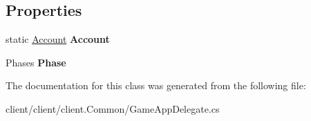 \subsection*{Properties}
\begin{DoxyCompactItemize}
\item 
\hypertarget{classClient_1_1Common_1_1GameAppDelegate_aa626869ffdd0e3f8f46ab069bc24f0d1}{static \hyperlink{classCore_1_1Models_1_1Account}{Account} {\bfseries Account}}\label{classClient_1_1Common_1_1GameAppDelegate_aa626869ffdd0e3f8f46ab069bc24f0d1}

\item 
\hypertarget{classClient_1_1Common_1_1GameAppDelegate_a2fb6f0fd7533c38a555760efd3ea896b}{Phases {\bfseries Phase}}\label{classClient_1_1Common_1_1GameAppDelegate_a2fb6f0fd7533c38a555760efd3ea896b}

\end{DoxyCompactItemize}


The documentation for this class was generated from the following file\-:\begin{DoxyCompactItemize}
\item 
client/client/client.\-Common/Game\-App\-Delegate.\-cs\end{DoxyCompactItemize}
